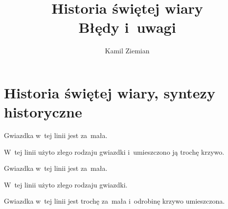 \documentclass[a4paper,11pt]{article}
\title{Historia świętej wiary \\
  {\Large Błędy i~uwagi}}
\author{Kamil Ziemian}
\begin{document}





\maketitle  %





\section{Historia świętej wiary, syntezy historyczne}

\vspace{\spaceTwo}







\start {} Gwiazdka w~tej linii jest za~mała.

\vspace{\spaceFour}



\start {} W~tej linii użyto złego rodzaju gwiazdki
i~umieszczono ją trochę krzywo.

\vspace{\spaceFour}



\start {} Gwiazdka w~tej linii jest za~mała.

\vspace{\spaceFour}



\start {} W~tej linii użyto złego rodzaju gwiazdki.

\vspace{\spaceFour}



\start {} Gwiazdka w~tej linii jest trochę za~mała
i~odrobinę krzywo umieszczona.
\end{document}
